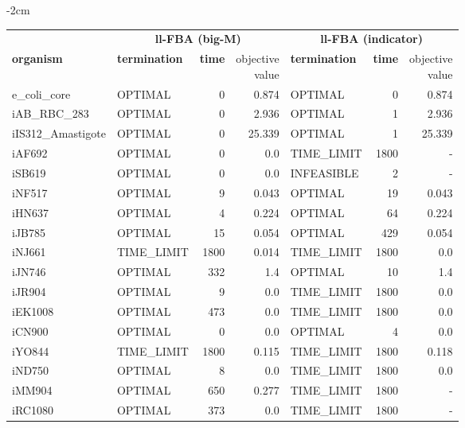 \begin{table}[!ht]
    \small
    \centering
    \addtolength{\leftskip} {-2cm}
    \addtolength{\rightskip}{-2cm}
    \begin{tabular}{@{\extracolsep{4pt}}llrrlrr@{}}
    \hline
        \multicolumn{1}{c}{} & \multicolumn{3}{c}{\textbf{ll-FBA (big-M)}} & \multicolumn{3}{c}{\textbf{ll-FBA (indicator)}}\\ \cline{2-4} \cline{5-7} 
        \textbf{organism} & \textbf{termination} & \textbf{time} & \thead{objective \\value} & \textbf{termination} & \textbf{time} & \thead{objective \\value} \\ \hline
        e\_coli\_core & OPTIMAL & 0 & 0.874 & OPTIMAL & 0 & 0.874 \\ 
        iAB\_RBC\_283 & OPTIMAL & 0 & 2.936 & OPTIMAL & 1 & 2.936 \\ 
        iIS312\_Amastigote & OPTIMAL & 0 & 25.339 & OPTIMAL & 1 & 25.339 \\ 
        iAF692 & OPTIMAL & 0 & 0.0 & TIME\_LIMIT & 1800 & - \\ 
        iSB619 & OPTIMAL & 0 & 0.0 & INFEASIBLE & 2 & - \\ 
        iNF517 & OPTIMAL & 9 & 0.043 & OPTIMAL & 19 & 0.043 \\ 
        iHN637 & OPTIMAL & 4 & 0.224 & OPTIMAL & 64 & 0.224 \\ 
        iJB785 & OPTIMAL & 15 & 0.054 & OPTIMAL & 429 & 0.054 \\ 
        iNJ661 & TIME\_LIMIT & 1800 & 0.014 & TIME\_LIMIT & 1800 & 0.0 \\ 
        iJN746 & OPTIMAL & 332 & 1.4 & OPTIMAL & 10 & 1.4 \\ 
        iJR904 & OPTIMAL & 9 & 0.0 & TIME\_LIMIT & 1800 & 0.0 \\ 
        iEK1008 & OPTIMAL & 473 & 0.0 & TIME\_LIMIT & 1800 & 0.0 \\ 
        iCN900 & OPTIMAL & 0 & 0.0 & OPTIMAL & 4 & 0.0 \\ 
        iYO844 & TIME\_LIMIT & 1800 & 0.115 & TIME\_LIMIT & 1800 & 0.118 \\ 
        iND750 & OPTIMAL & 8 & 0.0 & TIME\_LIMIT & 1800 & 0.0 \\ 
        iMM904 & OPTIMAL & 650 & 0.277 & TIME\_LIMIT & 1800 & - \\ 
        iRC1080 & OPTIMAL & 373 & 0.0 & TIME\_LIMIT & 1800 & - \\ 

\end{tabular}
\end{table}
